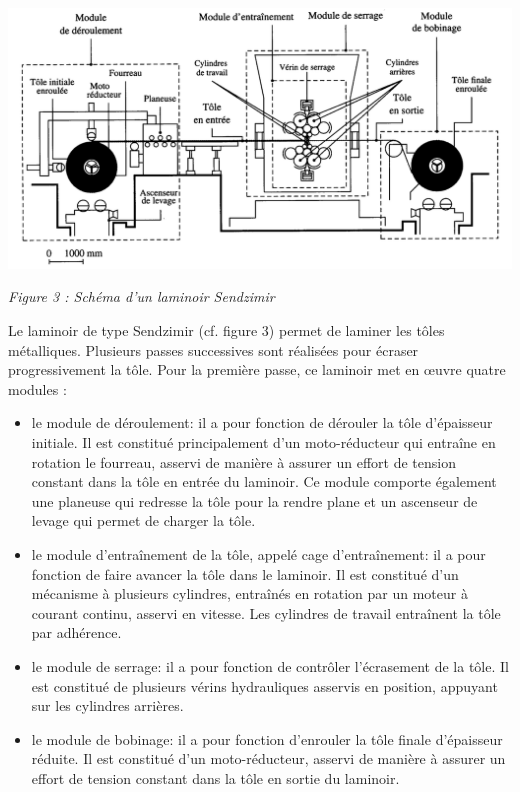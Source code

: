 \documentclass[11pt,oneside]{article}
\begin{document}
\begin{center}
\includegraphics[width=.95\textwidth]{png/figure_03}

\textit{Figure 3 : Schéma d'un laminoir Sendzimir}
\end{center}

Le laminoir de type Sendzimir (cf. figure 3) permet de laminer les tôles métalliques. Plusieurs passes successives sont réalisées pour écraser progressivement la tôle. Pour la première passe, ce laminoir met en œuvre quatre modules :
\begin{itemize}
\item le module de déroulement: il a pour fonction de dérouler la tôle d'épaisseur initiale. Il est constitué principalement d'un moto-réducteur qui entraîne en rotation le fourreau, asservi de manière à assurer un effort de tension constant dans la tôle en entrée du laminoir. Ce module comporte également une planeuse qui redresse la tôle pour la rendre plane et un ascenseur de levage qui permet de charger la tôle.
\item le module d'entraînement de la tôle, appelé cage d'entraînement: il a pour fonction de faire avancer la tôle dans le laminoir. Il est constitué d'un mécanisme à plusieurs cylindres, entraînés en rotation par un moteur à courant continu, asservi en vitesse. Les cylindres de travail entraînent la tôle par adhérence.
\item le module de serrage: il a pour fonction de contrôler l'écrasement de la tôle. Il est constitué de plusieurs vérins hydrauliques asservis en position, appuyant sur les cylindres arrières.
\item le module de bobinage: il a pour fonction d'enrouler la tôle finale d'épaisseur réduite. Il est constitué d'un moto-réducteur, asservi de manière à assurer un effort de tension constant dans la tôle en sortie du laminoir.
\end{itemize}
\end{document}
